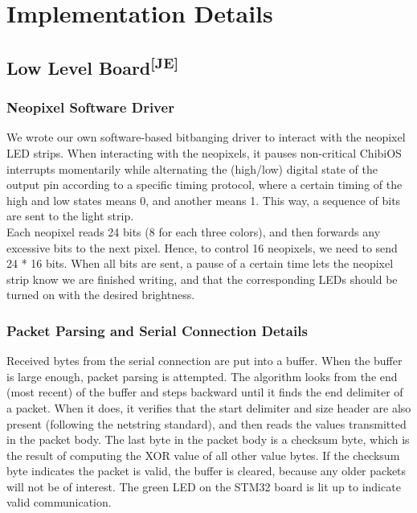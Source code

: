 \chapter{Implementation Details}
\hypertarget{impdetailstgt}{}
\label{impdetailslbl}
\section[Low Level Board]{Low Level Board\textsuperscript{[JE]}}
\subsection{Neopixel Software Driver}
We wrote our own software-based bitbanging driver to interact with the neopixel
LED strips. When interacting with the neopixels, it pauses non-critical ChibiOS
interrupts momentarily while alternating the (high/low) digital state of the
output pin according to a specific timing protocol, where a certain timing of
the high and low states means 0, and another means 1. This way, a sequence of
bits are sent to the light strip.\\

\noindent
Each neopixel reads 24 bits (8 for each three colors), and then forwards any
excessive bits to the next pixel. Hence, to control 16 neopixels, we need to
send 24 * 16 bits. When all bits are sent, a pause of a certain time lets the
neopixel strip know we are finished writing, and that the corresponding LEDs
should be turned on with the desired brightness.

\subsection{Packet Parsing and Serial Connection Details}
Received bytes from the serial connection are put into a buffer. When the buffer
is large enough, packet parsing is attempted. The algorithm looks from the end
(most recent) of the buffer and steps backward until it finds the end delimiter
of a packet. When it does, it verifies that the start delimiter and size header
are also present (following the netstring standard), and then reads the values
transmitted in the packet body. The last byte in the packet body is a checksum
byte, which is the result of computing the XOR value of all other value bytes.
If the checksum byte indicates the packet is valid, the buffer is cleared,
because any older packets will not be of interest. The green LED on the STM32
board is lit up to indicate valid communication.\\


